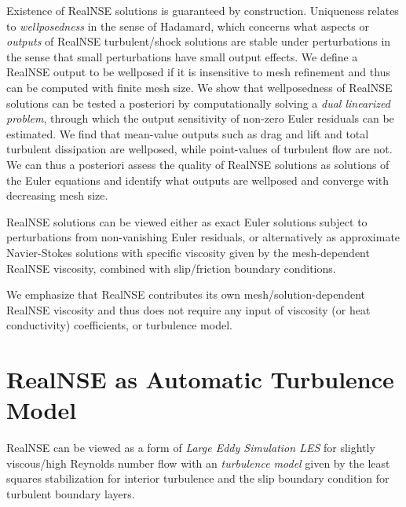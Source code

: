  
Existence of RealNSE solutions is guaranteed by construction. Uniqueness 
relates to \emph{wellposedness} in the sense
of Hadamard, which concerns what aspects or \emph{outputs} of 
RealNSE turbulent/shock solutions are stable under perturbations 
in the sense that small perturbations have small output effects.
We define a RealNSE output to be wellposed if
it is insensitive to mesh refinement and thus can be
computed with finite mesh size.
We show that wellposedness of RealNSE solutions
can be tested a posteriori by computationally solving a \emph{dual linearized
problem}, through which the output sensitivity of non-zero Euler residuals
can be estimated. We find that mean-value outputs such as drag and lift 
and total turbulent dissipation are wellposed, while point-values
of turbulent flow are not. We can thus a posteriori 
assess the quality of RealNSE solutions as solutions of the Euler 
equations and identify what outputs are wellposed and 
converge with decreasing mesh size.

RealNSE solutions can be viewed either as exact Euler solutions subject to 
perturbations from non-vanishing Euler residuals, or 
alternatively as approximate Navier-Stokes solutions
with specific viscosity given by the mesh-dependent RealNSE viscosity,
combined with slip/friction boundary conditions.  

We emphasize that RealNSE contributes its own mesh/solution-dependent RealNSE viscosity
and thus does not require any input of viscosity (or heat conductivity)
coefficients, or turbulence model.

 
\section{RealNSE as Automatic Turbulence Model}

RealNSE can be viewed as a form of \emph{Large Eddy Simulation LES} 
for slightly viscous/high Reynolds number flow with an
\emph{turbulence model} given by the 
least squares stabilization 
for interior turbulence and the slip boundary condition for
turbulent boundary layers.

